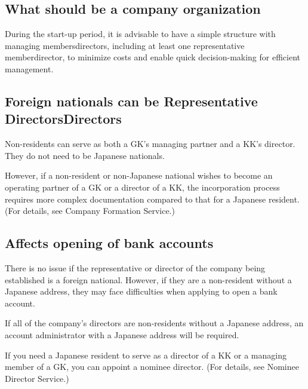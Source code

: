 \subsection{What should be a company organization}

During the start-up period, it is advisable to have a simple structure with managing members\/directors, including at least one representative member\/director, to minimize costs and enable quick decision-making for efficient management.

\subsection{Foreign nationals can be Representative Directors\/Directors}

Non-residents can serve as both a GK's managing partner and a KK's director. They do not need to be Japanese nationals.  

However, if a non-resident or non-Japanese national wishes to become an operating partner of a GK or a director of a KK, the incorporation process requires more complex documentation compared to that for a Japanese resident. (For details, see Company Formation Service.)

\subsection{Affects opening of bank accounts}

There is no issue if the representative or director of the company being established is a foreign national. However, if they are a non-resident without a Japanese address, they may face difficulties when applying to open a bank account.

If all of the company's directors are non-residents without a Japanese address, an account administrator with a Japanese address will be required.

If you need a Japanese resident to serve as a director of a KK or a managing member of a GK, you can appoint a nominee director. (For details, see Nominee Director Service.)

\clearpage









\section{}
